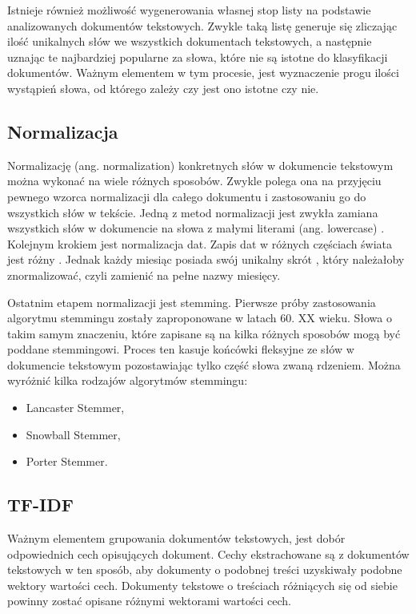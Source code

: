     Istnieje również możliwość wygenerowania własnej stop listy na podstawie analizowanych dokumentów tekstowych. Zwykle taką listę generuje się zliczając ilość unikalnych słów we wszystkich dokumentach tekstowych, a następnie uznając te najbardziej popularne za słowa, które nie są istotne do klasyfikacji dokumentów. Ważnym elementem w tym procesie, jest wyznaczenie progu ilości wystąpień słowa, od którego zależy czy jest ono istotne czy nie.
    
    \subsection{Normalizacja} \label{sec:normalizacja}
    Normalizację (ang. normalization) konkretnych słów w dokumencie tekstowym można wykonać na wiele różnych sposobów. Zwykle polega ona na przyjęciu pewnego wzorca normalizacji dla całego dokumentu i zastosowaniu go do wszystkich słów w tekście. Jedną z metod normalizacji jest zwykła zamiana wszystkich słów w dokumencie na słowa z małymi literami (ang. lowercase) \cite{normalizeText}. Kolejnym krokiem jest normalizacja dat. Zapis dat w różnych częściach świata jest różny \cite{wiki:Date_format_by_country}. Jednak każdy miesiąc posiada swój unikalny skrót \cite{skrotyMiesiecy}, który należałoby znormalizować, czyli zamienić na pełne nazwy miesięcy. 
    
    Ostatnim etapem normalizacji jest stemming. Pierwsze próby zastosowania algorytmu stemmingu zostały zaproponowane w latach 60. XX wieku. Słowa o takim samym znaczeniu, które zapisane są na kilka różnych sposobów mogą być poddane stemmingowi. Proces ten kasuje końcówki fleksyjne ze słów w dokumencie tekstowym pozostawiając tylko część słowa zwaną rdzeniem. Można wyróżnić kilka rodzajów algorytmów stemmingu:
    \begin{itemize}
        \item Lancaster Stemmer,
        \item Snowball Stemmer,
        \item Porter Stemmer.
    \end{itemize}
    
    
    \newpage
    \subsection{TF-IDF} \label{sec:tfidf}
        Ważnym elementem grupowania dokumentów tekstowych, jest dobór odpowiednich cech opisujących dokument. Cechy ekstrachowane są z dokumentów tekstowych w ten sposób, aby dokumenty o podobnej treści uzyskiwały podobne wektory wartości cech. Dokumenty tekstowe o treściach różniących się od siebie powinny zostać opisane różnymi wektorami wartości cech.
        

